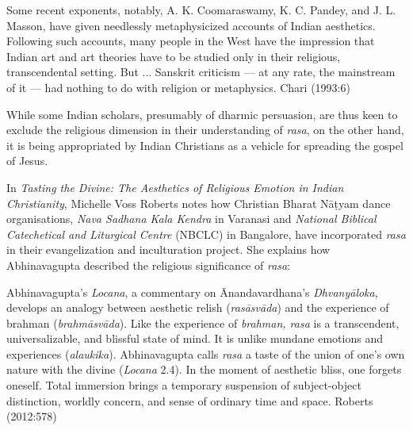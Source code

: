 \begin{myquote}
Some recent exponents, notably, A. K. Coomaraswamy, K. C. Pandey, and J. L. Masson, have given needlessly metaphysicized accounts of Indian aesthetics. Following such accounts, many people in the West have the impression that Indian art and art theories have to be studied only in their religious, transcendental setting. But ... Sanskrit criticism --- at any rate, the mainstream of it --- had nothing to do with religion or metaphysics. 
\hfill Chari (1993:6)
\end{myquote}

While some Indian scholars, presumably of dharmic persuasion, are thus keen to exclude the religious dimension in their understanding of \textsl{rasa}, on the other hand, it is being appropriated by Indian Christians as a vehicle for spreading the gospel of Jesus. 

In \textsl{Tasting the Divine: The Aesthetics of Religious Emotion in Indian Christianity}, Michelle Voss Roberts notes how Christian Bharat Nāṭyam dance organisations, \textsl{Nava Sadhana Kala Kendra} in Varanasi and \textsl{National Biblical Catechetical and Liturgical Centre} (NBCLC) in Bangalore, have incorporated \textsl{rasa} in their evangelization and inculturation project. She explains how Abhinavagupta described the religious significance of \textsl{rasa}:

\begin{myquote}
Abhinavagupta's \textsl{Locana}, a commentary on Ānandavardhana's \textsl{Dhvanyā\-loka}, develops an analogy between aesthetic relish (\textsl{rasāsvāda}) and the experience of brahman (\textsl{brahmāsvāda}). Like the experience of \textsl{brahman, rasa} is a transcendent, universalizable, and blissful state of mind. It is unlike mundane emotions and experiences (\textsl{alaukika}). Abhinavagupta calls \textsl{rasa} a taste of the union of one's own nature with the divine (\textsl{Locana} 2.4). In the moment of aesthetic bliss, one forgets oneself. Total immersion brings a temporary suspension of subject-object distinction, worldly concern, and sense of ordinary time and space. 
\hfill Roberts (2012:578)
\end{myquote}

